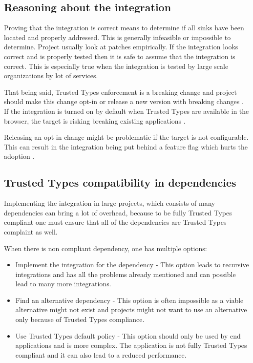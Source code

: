 \subsection{Reasoning about the integration}
\label{sub:reason_about_integration}

Proving that the integration is correct means to determine if all sinks have been located and
properly addressed. This is generally infeasible or impossible to determine. Project usually look at
patches empirically. If the integration looks correct and is properly tested then it is safe to
assume that the integration is correct. This is especially true when the integration is tested by
large scale organizations by lot of services.

That being said, Trusted Types enforcement is a breaking change and project should make this change
opt-in or release a new version with breaking changes \cite{dom_purify_major_version}. If the
integration is turned on by default when Trusted Types are available in the browser, the target is
risking breaking existing applications \cite{dom_purify_breakage}.

Releasing an opt-in change might be problematic if the target is not configurable. This can result
in the integration being put behind a feature flag which hurts the adoption
\cite{react_tt_feature_flag}.

\subsection{Trusted Types compatibility in dependencies}
\label{sub:tt_compatibility_in_deps}

Implementing the integration in large projects, which consists of many dependencies can bring a lot
of overhead, because to be fully Trusted Types compliant one must ensure that all of the
dependencies are Trusted Types complaint as well.

When there is non compliant dependency, one has multiple options:

\begin{itemize}
  \item Implement the integration for the dependency - This option leads to recursive integrations
        and has all the problems already mentioned and can possible lead to many more integrations.
  \item Find an alternative dependency - This option is often impossible as a viable alternative
        might not exist and projects might not want to use an alternative only because of Trusted
        Types compliance.
  \item Use Trusted Types default policy - This option should only be used by end applications and
        is more complex. The application is not fully Trusted Types compliant and it can also lead
        to a reduced performance.
\end{itemize}

